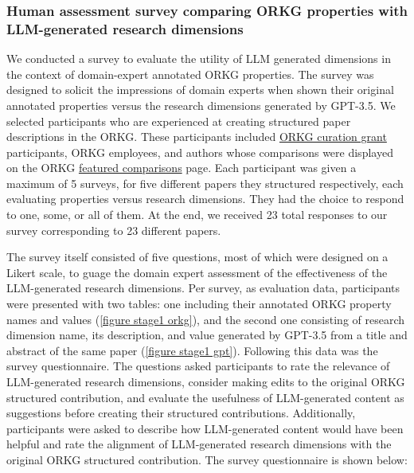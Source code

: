 \subsubsection{Human assessment survey comparing ORKG properties with LLM-generated research dimensions}

We conducted a survey to evaluate the utility of LLM generated dimensions in the context of domain-expert annotated ORKG properties. The survey was designed to solicit the impressions of domain experts when shown their original annotated properties versus the research dimensions generated by GPT-3.5. We selected participants who are experienced at creating structured paper descriptions in the ORKG. These participants included \href{https://orkg.org/about/28/Curation_Grants}{ORKG curation grant} participants, ORKG employees, and authors whose comparisons were displayed on the ORKG \href{https://orkg.org/featured-comparisons}{featured comparisons} page. Each participant was given a maximum of 5 surveys, for five different papers they structured respectively, each evaluating properties versus research dimensions. They had the choice to respond to one, some, or all of them. At the end, we received 23 total responses to our survey corresponding to 23 different papers.

The survey itself consisted of five questions, most of which were designed on a Likert scale, to guage the domain expert assessment of the effectiveness of the LLM-generated research dimensions. Per survey, as evaluation data, participants were presented with two tables: one including their annotated ORKG property names and values (\autoref{figure stage1 orkg}), and the second one consisting of research dimension name, its description, and value generated by GPT-3.5 from a title and abstract of the same paper (\autoref{figure stage1 gpt}). Following this data was the survey questionnaire. The questions asked participants to rate the relevance of LLM-generated research dimensions, consider making edits to the original ORKG structured contribution, and evaluate the usefulness of LLM-generated content as suggestions before creating their structured contributions. Additionally, participants were asked to describe how LLM-generated content would have been helpful and rate the alignment of LLM-generated research dimensions with the original ORKG structured contribution. The survey questionnaire is shown below:

